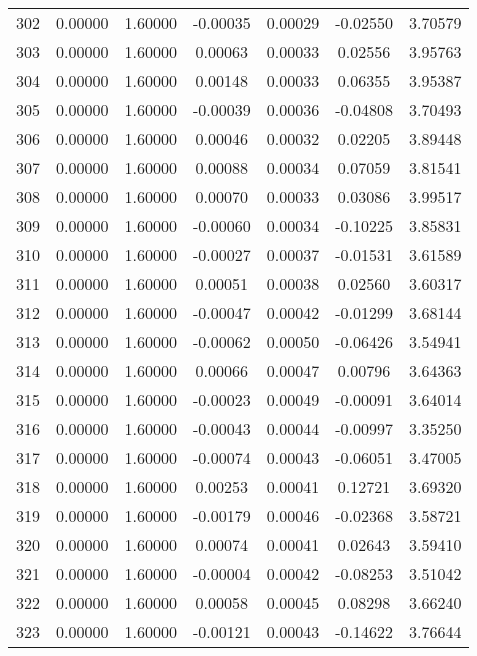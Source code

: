 \begin{longtable}{c c c c c c c}
302 &  0.00000 &      1.60000 & -0.00035 &   0.00029 &  -0.02550 &   3.70579 \\
303 &  0.00000 &      1.60000 &  0.00063 &   0.00033 &   0.02556 &   3.95763 \\
304 &  0.00000 &      1.60000 &  0.00148 &   0.00033 &   0.06355 &   3.95387 \\
305 &  0.00000 &      1.60000 & -0.00039 &   0.00036 &  -0.04808 &   3.70493 \\
306 &  0.00000 &      1.60000 &  0.00046 &   0.00032 &   0.02205 &   3.89448 \\
307 &  0.00000 &      1.60000 &  0.00088 &   0.00034 &   0.07059 &   3.81541 \\
308 &  0.00000 &      1.60000 &  0.00070 &   0.00033 &   0.03086 &   3.99517 \\
309 &  0.00000 &      1.60000 & -0.00060 &   0.00034 &  -0.10225 &   3.85831 \\
310 &  0.00000 &      1.60000 & -0.00027 &   0.00037 &  -0.01531 &   3.61589 \\
311 &  0.00000 &      1.60000 &  0.00051 &   0.00038 &   0.02560 &   3.60317 \\
312 &  0.00000 &      1.60000 & -0.00047 &   0.00042 &  -0.01299 &   3.68144 \\
313 &  0.00000 &      1.60000 & -0.00062 &   0.00050 &  -0.06426 &   3.54941 \\
314 &  0.00000 &      1.60000 &  0.00066 &   0.00047 &   0.00796 &   3.64363 \\
315 &  0.00000 &      1.60000 & -0.00023 &   0.00049 &  -0.00091 &   3.64014 \\
316 &  0.00000 &      1.60000 & -0.00043 &   0.00044 &  -0.00997 &   3.35250 \\
317 &  0.00000 &      1.60000 & -0.00074 &   0.00043 &  -0.06051 &   3.47005 \\
318 &  0.00000 &      1.60000 &  0.00253 &   0.00041 &   0.12721 &   3.69320 \\
319 &  0.00000 &      1.60000 & -0.00179 &   0.00046 &  -0.02368 &   3.58721 \\
320 &  0.00000 &      1.60000 &  0.00074 &   0.00041 &   0.02643 &   3.59410 \\
321 &  0.00000 &      1.60000 & -0.00004 &   0.00042 &  -0.08253 &   3.51042 \\
322 &  0.00000 &      1.60000 &  0.00058 &   0.00045 &   0.08298 &   3.66240 \\
323 &  0.00000 &      1.60000 & -0.00121 &   0.00043 &  -0.14622 &   3.76644 \\

\end{longtable}
